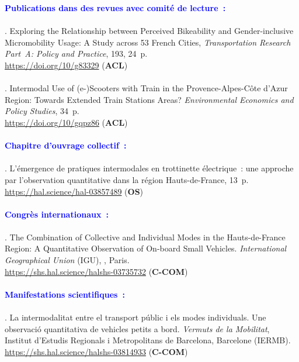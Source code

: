 \begin{refsegment}
    \begin{tcolorbox}[colback=white!5!white,
                      colframe=blue!75!blue,
                      title=Valorisation scientifique
                      \\
                      Chapitre~4]
\Large{\textcolor{blue}{\textbf{Publications dans des revues avec comité de lecture~:}}}
    \\\\
\small{\textcolor{blue}{\textcite{moinse_exploring_2025}}. Exploring the Relationship between Perceived Bikeability and Gender-inclusive Micromobility Usage: A Study across 53 French Cities, \textsl{Transportation Research Part~A: Policy and Practice}, 193, 24~p.
\\
\footnotesize{\url{https://doi.org/10/g83329}} (\textbf{ACL})}
    \\\\
\small{\textcolor{blue}{\textcite{moinse_intermodal_2022}}. Intermodal Use of (e-)Scooters with Train in the Provence-Alpes-Côte d’Azur Region: Towards Extended Train Stations Areas? \textsl{Environmental Economics and Policy Studies}, 34~p. 
\\
\footnotesize{\url{https://doi.org/10/gqpz86}} (\textbf{ACL})}
    \\\\
\Large{\textcolor{blue}{\textbf{Chapitre d'ouvrage collectif~:}}}
    \\\\
\small{\textcolor{blue}{\textcite{moinse_lemergence_2022}}. L'émergence de pratiques intermodales en trottinette électrique~: une approche par l'observation quantitative dans la région Hauts-de-France, 13~p.
\\
\footnotesize{\url{https://hal.science/hal-03857489}} (\textbf{OS})}
    \\\\
\Large{\textcolor{blue}{\textbf{Congrès internationaux~:}}}
    \\\\
\small{\textcolor{blue}{\textcite{moinse_combination_2022}}. The Combination of Collective and Individual Modes in the Hauts-de-France Region: A Quantitative Observation of On-board Small Vehicles. \textsl{International Geographical Union} (IGU), , Paris. 
\\
\footnotesize{\url{https://shs.hal.science/halshs-03735732}} (\textbf{C-COM})}
    \\\\
\Large{\textcolor{blue}{\textbf{Manifestations scientifiques~:}}}
    \\\\
\small{\textcolor{blue}{\textcite{moinse_intermodalitat_2022}}. La intermodalitat entre el transport públic i els modes individuals. Une observació quantitativa de vehicles petits a bord. \textit{Vermuts de la Mobilitat}, Institut d'Estudis Regionals i Metropolitans de Barcelona, Barcelone (IERMB).
\\
\footnotesize{\url{https://shs.hal.science/halshs-03814933}} (\textbf{C-COM})}
    \end{tcolorbox}


\end{refsegment}
